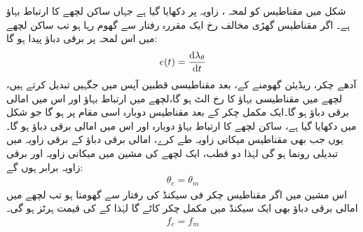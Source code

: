  شکل   میں مقناطیس کو لمحہ ،  زاویہ  پر دکھایا گیا ہے جہاں ساکن لچھے کا ارتباط بہاؤ  ہے۔ اگر مقناطیس گھڑی  مخالف رخ ایک مقررہ رفتار  سے  گھوم رہا ہو تب ساکن لچھے میں اس لمحہ پر برقی دباؤ  پیدا ہو گا:
\begin{align}
e(t)=\frac{\dif \lambda_\theta}{\dif t}
\end{align}
آدھے چکر،  ریڈیئن  گھومنے کے،  بعد  مقناطیسی  قطبین آپس میں جگہیں تبدیل کرتے ہیں، لچھے میں مقناطیسی بہاؤ کا رخ الٹ ہو گا،لچھے میں ارتباط بہاؤ   اور اس میں امالی برقی دباؤ  ہو گا۔ایک مکمل چکر کے  بعد مقناطیس  دوبارہ اسی مقام پر ہو گا جو شکل  میں دکھایا گیا ہے، ساکن لچھے کا ارتباط بہاؤ دوبارہ  اور اس میں امالی برقی دباؤ  ہو گا۔ یوں جب بھی مقناطیس    میکانی زاویہ طے کرے،  امالی برقی دباؤ کے  برقی زاویہ میں   تبدیلی رونما ہو گی  لہٰذا دو قطب، ایک لچھے  کی مشین میں میکانی زاویہ  اور برقی زاویہ   برابر ہوں گے:
\begin{align*}
\theta_e=\theta_m
\end{align*}
اس مشین میں اگر مقناطیس  چکر فی سیکنڈ کی رفتار سے گھومتا ہو تب لچھے میں امالی برقی دباؤ  بھی ایک سیکنڈ میں  مکمل چکر کاٹے گا لہٰذا   کے     کی قیمت   ہرٹز ہو گی۔
\begin{align*}
f_e=f_m
\end{align*}
%
